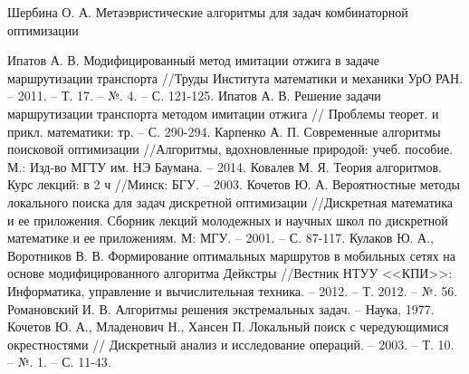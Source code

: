\begin{thebibliography}{10}
     Шербина О. А. Метаэвристические алгоритмы для задач комбинаторной оптимизации 
    
     Ипатов А. В. Модифицированный метод имитации отжига в задаче маршрутизации 
        транспорта //Труды Института математики и механики УрО РАН. -- 2011. -- Т. 17. -- №. 4. -- С. 121-125.
     Ипатов А. В. Решение задачи маршрутизации транспорта методом имитации отжига //
        Проблемы теорет. и прикл. математики: тр. -- С. 290-294.
     Карпенко А. П. Современные алгоритмы поисковой оптимизации //Алгоритмы, 
        вдохновленные природой: учеб. пособие. М.: Изд-во МГТУ им. НЭ Баумана. -- 2014.
     Ковалев М. Я. Теория алгоритмов. Курс лекций: в 2 ч //Минск: БГУ. -- 2003.
     Кочетов Ю. А. Вероятностные методы локального поиска для задач дискретной 
        оптимизации //Дискретная математика и ее приложения. Сборник лекций молодежных и научных школ 
        по дискретной математике и ее приложениям. М: МГУ. -- 2001. -- С. 87-117.
     Кулаков Ю. А., Воротников В. В. Формирование оптимальных маршрутов в мобильных сетях 
        на основе модифицированного алгоритма Дейкстры //Вестник НТУУ <<КПИ>>: Информатика, управление 
        и вычислительная техника. -- 2012. -- Т. 2012. -- №. 56.
     Романовский И. В. Алгоритмы решения экстремальных задач. -- Наука, 1977.
     Кочетов Ю. А., Младенович Н., Хансен П. Локальный поиск с чередующимися окрестностями //
        Дискретный анализ и исследование операций. -- 2003. -- Т. 10. -- №. 1. -- С. 11-43.

\end{thebibliography}

\pagestyle{plain}